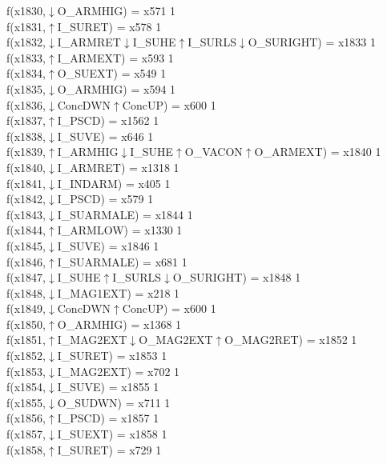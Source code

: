 f(x1830,$\downarrow$O\_ARMHIG) = x571 {1} \\
f(x1831,$\uparrow$I\_SURET) = x578 {1} \\
f(x1832,$\downarrow$I\_ARMRET$\downarrow$I\_SUHE$\uparrow$I\_SURLS$\downarrow$O\_SURIGHT) = x1833 {1} \\
f(x1833,$\uparrow$I\_ARMEXT) = x593 {1} \\
f(x1834,$\uparrow$O\_SUEXT) = x549 {1} \\
f(x1835,$\downarrow$O\_ARMHIG) = x594 {1} \\
f(x1836,$\downarrow$ConcDWN$\uparrow$ConcUP) = x600 {1} \\
f(x1837,$\uparrow$I\_PSCD) = x1562 {1} \\
f(x1838,$\downarrow$I\_SUVE) = x646 {1} \\
f(x1839,$\uparrow$I\_ARMHIG$\downarrow$I\_SUHE$\uparrow$O\_VACON$\uparrow$O\_ARMEXT) = x1840 {1} \\
f(x1840,$\downarrow$I\_ARMRET) = x1318 {1} \\
f(x1841,$\downarrow$I\_INDARM) = x405 {1} \\
f(x1842,$\downarrow$I\_PSCD) = x579 {1} \\
f(x1843,$\downarrow$I\_SUARMALE) = x1844 {1} \\
f(x1844,$\uparrow$I\_ARMLOW) = x1330 {1} \\
f(x1845,$\downarrow$I\_SUVE) = x1846 {1} \\
f(x1846,$\uparrow$I\_SUARMALE) = x681 {1} \\
f(x1847,$\downarrow$I\_SUHE$\uparrow$I\_SURLS$\downarrow$O\_SURIGHT) = x1848 {1} \\
f(x1848,$\downarrow$I\_MAG1EXT) = x218 {1} \\
f(x1849,$\downarrow$ConcDWN$\uparrow$ConcUP) = x600 {1} \\
f(x1850,$\uparrow$O\_ARMHIG) = x1368 {1} \\
f(x1851,$\uparrow$I\_MAG2EXT$\downarrow$O\_MAG2EXT$\uparrow$O\_MAG2RET) = x1852 {1} \\
f(x1852,$\downarrow$I\_SURET) = x1853 {1} \\
f(x1853,$\downarrow$I\_MAG2EXT) = x702 {1} \\
f(x1854,$\downarrow$I\_SUVE) = x1855 {1} \\
f(x1855,$\downarrow$O\_SUDWN) = x711 {1} \\
f(x1856,$\uparrow$I\_PSCD) = x1857 {1} \\
f(x1857,$\downarrow$I\_SUEXT) = x1858 {1} \\
f(x1858,$\uparrow$I\_SURET) = x729 {1} \\

